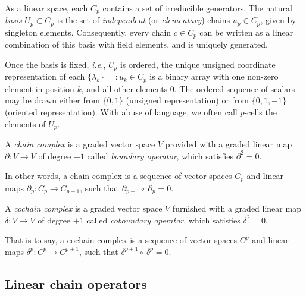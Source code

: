 \begin{definition}
As a linear space, each $C_p$ contains a set of irreducible generators.
The natural \emph{basis} $U_p \subset C_p$  is the set of \emph{independent} (or \emph{elementary}) chains $u_p \in C_p$, given
by singleton elements. Consequently, every chain $c\in C_p$ can be written as 
a linear combination of this basis with field elements, and is uniquely generated. 
\end{definition}

Once  the  basis is fixed, \emph{i.e.}, $U_p$ is ordered, the unique unsigned coordinate
representation of each $\{\lambda_k\} =: u_k \in C_p$ is a binary array with one non-zero element in position $k$, and all other elements 0. The ordered
sequence of scalars may be drawn either from $\{0,1\}$ (unsigned representation) or from
$\{0,1,-1\}$ (oriented representation). 
With abuse of language, we
often call $p$-cells the elements of $U_p$.


\begin{definition}
A \emph{chain complex} is a graded vector  space $V$ provided with a graded
linear map $\partial : V \to V$ of degree $-1$ called
\emph{boundary operator}, which satisfies $\partial^2 = 0$. 
\end{definition}


In other words, a chain complex
is a sequence of vector spaces $C_p$ and linear maps $\partial_p : C_p \to C_{p-1}$,
such that $\partial_{p-1} \circ\ \partial_{p} = 0$. 


\begin{definition}
A \emph{cochain complex} is a graded vector space $V$ furnished with a graded
linear map $\delta : V \to V$ of degree $+1$ 
called \emph{coboundary operator},  which satisfies $\delta^2 = 0$. 
\end{definition}

That is to say, a cochain complex is a
sequence of vector spaces $C^p$ and linear maps $\delta^p : C^p \to C^{p+1}$,
such that $\delta^{p+1} \circ\ \delta^{p} = 0$. 


\subsection{Linear chain operators}\label{sect:3-3-2}

